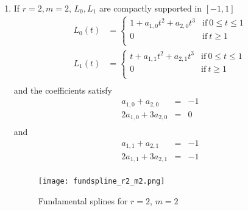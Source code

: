 \begin{enumerate}
  \item If $r=2, m=2$, $L_0, L_1$ are compactly supported in $[-1,1]$
    \begin{align*}
      L_0(t) &= 
      \begin{cases}
	 1 + a_{1,0} t^2 + a_{2,0}t^3 & \text{if} \ 0 \leq t \leq 1 \\
         0 & \text{if} \  t \geq 1 \\
      \end{cases} \\
      L_1(t) &= 
      \begin{cases}
         t + a_{1,1} t^2 + a_{2,1}t^3 & \text{if} \ 0 \leq t \leq 1 \\
         0 & \text{if} \  t \geq 1 \\
      \end{cases} \\
    \end{align*}
    and the coefficients satisfy
    \begin{equation*}
     \begin{array}{rcl}
     a_{1,0} + a_{2,0} & = & -1  \\
     2a_{1,0} + 3a_{2,0} & = & 0 \\
    \end{array}
    \end{equation*}
    and 
    \begin{equation*}
    \begin{array}{rcl}
     a_{1,1} + a_{2,1} & = & -1  \\
     2a_{1,1} + 3a_{2,1} & = & -1 \\
    \end{array}
    \end{equation*}
    \begin{figure}[!h]
      \centering
      \texttt{[image: fundspline\_r2\_m2.png]}
      \caption{Fundamental splines for $r=2$, $m=2$}\label{fig:fund-r2-m2}
    \end{figure}


\end{enumerate}
